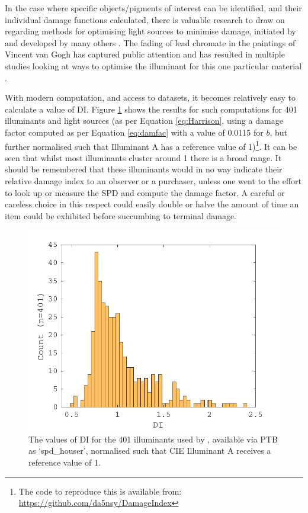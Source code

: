 In the case where specific objects/pigments of interest can be identified, and their individual damage functions calculated, there is valuable research to draw on regarding methods for optimising light sources to minimise damage, initiated by \citet{miller_evaluating_1993} and developed by many others \citep{durmus_optimising_2017,durmus_colour_2015,durmus_optimising_2015,durmus_object_2017,delgado_ramos_art_2009,delgado_lighting_2011,luna_selective_2015,cuttle_proposal_2000,vazquez_point_2017}. The fading of lead chromate in the paintings of Vincent van Gogh has captured public attention \citep{lewis_smith_will_2013} and has resulted in multiple studies looking at ways to optimise the illuminant for this one particular material \citep{lunz_can_2017,monico_degradation_2011}.

With modern computation, and access to datasets, it becomes relatively easy to calculate a value of \acrfull{DI}. Figure \ref{fig:Houser} shows the results for such computations for 401 illuminants and light sources (as per Equation \ref{eq:Harrison}, using a damage factor computed as per Equation \ref{eq:damfac} with a value of 0.0115 for $b$, but further normalised such that Illuminant A has a reference value of 1)\footnote{The code to reproduce this is available from: \url{https://github.com/da5nsy/DamageIndex}}. It can be seen that whilst most illuminants cluster around 1 there is a broad range. It should be remembered that these illuminants would in no way indicate their relative damage index to an observer or a purchaser, unless one went to the effort to look up or measure the \gls{SPD} and compute the damage factor. A careful or careless choice in this respect could easily double or halve the amount of time an item could be exhibited before succumbing to terminal damage.

\begin{figure}[htbp]
\includegraphics[max width=\textwidth]{figs/LitRev/DI.pdf}
\caption{The values of \acrfull{DI} for the 401 illuminants used by \citet{houser_review_2013}, available via \gls{PTB} as `spd\_houser', normalised such that \gls{CIE} Illuminant A receives a reference value of 1.}
\label{fig:Houser}
\end{figure}


